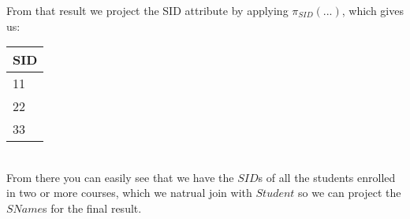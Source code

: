 \documentclass[10pt]{article}
\begin{document}
From that result we project the SID attribute by applying $\pi_{SID} (...)$, which gives us:\\

\begin{tabular}{|l|}\hline
\rowcolor{lightgray} SID  \\\hline
11 \\\hline
22 \\\hline
33 \\\hline
\end{tabular}\\

From there you can easily see that we have the $SID$s of all the students enrolled in two or more courses, which we natrual join with $Student$ so we can project the $SName$s for the final result.









\end{document}
